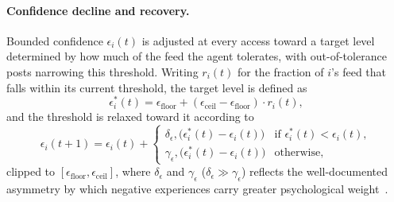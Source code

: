 \documentclass{svproc}
\def\BoundedConfidence{\epsilon} %
\begin{document}
\paragraph{Confidence decline and recovery.} 
Bounded confidence $\BoundedConfidence_i(t)$ is adjusted at every
access toward a target level determined by how much of the feed the
agent tolerates, with out-of-tolerance posts narrowing this
threshold. Writing $r_i(t)$ for the fraction of $i$'s feed that falls
within its current threshold, the target level is defined as
%
\begin{equation} 
  \BoundedConfidence_i^{\ast}(t) =
  \BoundedConfidence_{\mathrm{floor}} + (\BoundedConfidence_{\mathrm{ceil}}-\BoundedConfidence_{\mathrm{floor}})\cdot r_i(t), 
\end{equation} 
%
and the threshold is relaxed toward it according to 
%
\begin{equation} 
  \BoundedConfidence_i(t{+}1) = \BoundedConfidence_i(t) +
  \begin{cases}
    \delta_{\BoundedConfidence},
    \big(\BoundedConfidence_i^{\ast}(t)-\BoundedConfidence_i(t)\big)
    & \text{if } \BoundedConfidence_i^{\ast}(t) <
    \BoundedConfidence_i(t), \\[2pt]
    \gamma_{\BoundedConfidence},
    \big(\BoundedConfidence_i^{\ast}(t)-\BoundedConfidence_i(t)\big)
      & \text{otherwise},
  \end{cases}\label{eq:bc} 
\end{equation} 
%
clipped to
$[\BoundedConfidence_{\mathrm{floor}},\BoundedConfidence_{\mathrm{ceil}}]$,
where $\delta_{\BoundedConfidence}$ and $\gamma_{\BoundedConfidence}$
($\delta_{\BoundedConfidence}\gg\gamma_{\BoundedConfidence}$) 
reflects the well-documented asymmetry by which negative experiences
carry greater psychological weight~\cite{baumeister2001}.
\end{document}
